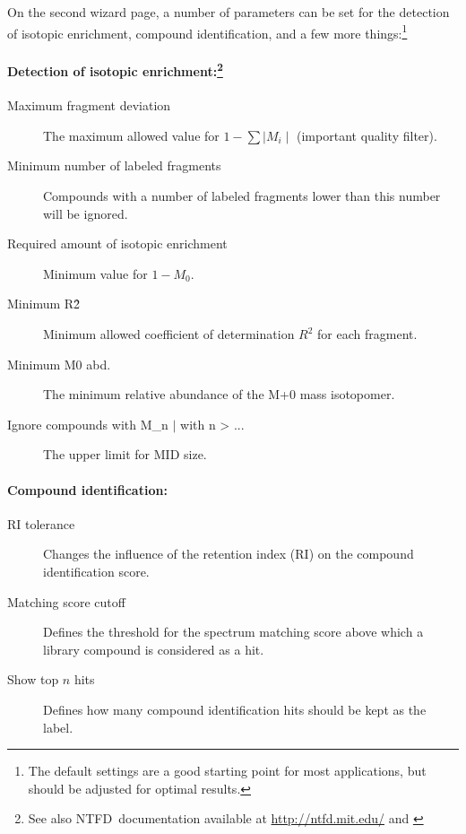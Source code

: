 \documentclass[a4paper,12pt]{scrartcl}
\newcommand*\NTFD{\textsc{NTFD}}
\begin{document}
On the second wizard page, a number of parameters can be set for the detection of isotopic enrichment, compound identification, and a few more things:\footnote{The default settings are a good starting point for most applications, but should be adjusted for optimal results.}

\paragraph[Detection of isotopic enrichment]{Detection of isotopic enrichment:\footnote{See also \NTFD\ documentation available at \url{http://ntfd.mit.edu/} and \cite{Weindl2015a}}}

\begin{description}
 \item[Maximum fragment deviation]
 The maximum allowed value for $1 - \sum \mid M_i \mid$ (important quality filter).
 
 \item[Minimum number of labeled fragments]
 Compounds with a number of labeled fragments lower than this number will be ignored.
 
 \item[Required amount of isotopic enrichment]
 Minimum value for $1 - M_0$.
 
 \item[Minimum R\^ 2]
 Minimum allowed coefficient of determination $R^2$ for each fragment. 
 
 \item[Minimum M0 abd.]
 The minimum relative abundance of the M+0 mass isotopomer.
 
 \item[Ignore compounds with M\_n $\mid$ with n > ...]
 The upper limit for MID size.
\end{description}

\paragraph{Compound identification:}
\begin{description}
 \item[RI tolerance]
 Changes the influence of the retention index (RI) on the compound identification score.
 
 \item[Matching score cutoff]
 Defines the threshold for the spectrum matching score above which a library compound is considered as a hit.
 
 \item[Show top $n$ hits]
 Defines how many compound identification hits should be kept as the label.
\end{description}
\end{document}
